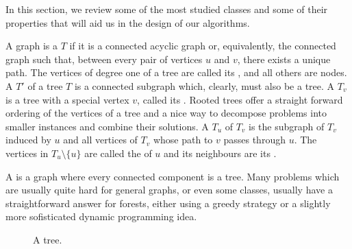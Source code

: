 In this section, we review some of the most studied classes and some of their properties that will aid us in the design of our algorithms.

A graph is a  $T$ if it is a connected acyclic graph or, equivalently, the connected graph such that, between every pair of vertices $u$ and $v$, there exists a unique path.
The vertices of degree one of a tree are called its , and all others are  nodes. A  $T'$ of a tree $T$ is a connected subgraph which, clearly, must also be a tree.
A  $T_v$ is a tree with a special vertex $v$, called its .
Rooted trees offer a straight forward ordering of the vertices of a tree and a nice way to decompose problems into smaller instances and combine their solutions.
A  $T_u$ of $T_v$ is the subgraph of $T_v$ induced by $u$ and all vertices of $T_v$ whose path to $v$ passes through $u$.
The vertices in $T_u \setminus \{u\}$ are called the  of $u$ and its neighbours are its .

A  is a graph where every connected component is a tree.
Many problems which are usually quite hard for general graphs, or even some classes, usually have a straightforward answer for forests, either using a greedy strategy or a slightly more sofisticated dynamic programming idea.

\begin{figure}
    \centering
    \caption{A tree.}
    \label{fig:some_tree}
\end{figure}


